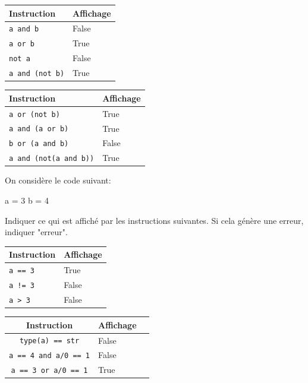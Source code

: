 \documentclass[a4paper,10pt]{report}
\renewcommand{\arraystretch}{1}  %
\def\ptsexoF{1}
\begin{document}
\renewcommand{\arraystretch}{1.2}
    \begin{tabular}{|p{4cm}|p{3cm}|}
        \hline
         Instruction & Affichage\\ \hline
         \verb|a and b|&False\\\hline
        \verb|a or b| &True\\\hline
        \verb|not a| &False\\\hline
        \verb|a and (not b)|&True\\\hline
        
        
    \end{tabular}\hfill
\renewcommand{\arraystretch}{1.2}
    \begin{tabular}{|p{4cm}|p{3cm}|}
        \hline
         Instruction & Affichage\\ \hline
        \verb|a or (not b)| &True\\\hline
        \verb|a and (a or b)|&True\\\hline
        \verb|b or (a and b)|&False\\\hline
        \verb|a and (not(a and b))|&True\\\hline
    \end{tabular}
\bigskip


\exods{\ptsexoF}

On considère le code suivant:

\begin{CodePythontexAlt}[TaillePolice=\large,Largeur=1\linewidth,Centre,PremLigne=1]{}
a = 3
b = 4
\end{CodePythontexAlt}


Indiquer ce qui est affiché par les instructions suivantes. Si cela génère une erreur, indiquer "erreur".

\renewcommand{\arraystretch}{1.2}
    \begin{tabular}{|p{4cm}|p{3cm}|}
        \hline
         Instruction & Affichage\\ \hline
         \verb|a == 3|&True\\\hline
        \verb|a != 3| &False\\\hline
        \verb|a > 3| &False\\\hline
        
        
        
    \end{tabular}\hfill
\renewcommand{\arraystretch}{1.2}
    \begin{tabular}{|c|p{4cm}|p{3cm}|}
        \hline
         Instruction & Affichage\\ \hline
        \verb|type(a) == str|&False\\\hline
        \verb|a == 4 and a/0 == 1|&False\\\hline
        \verb|a == 3 or a/0 == 1| &True\\\hline
         \end{tabular}
\bigskip
\end{document}
